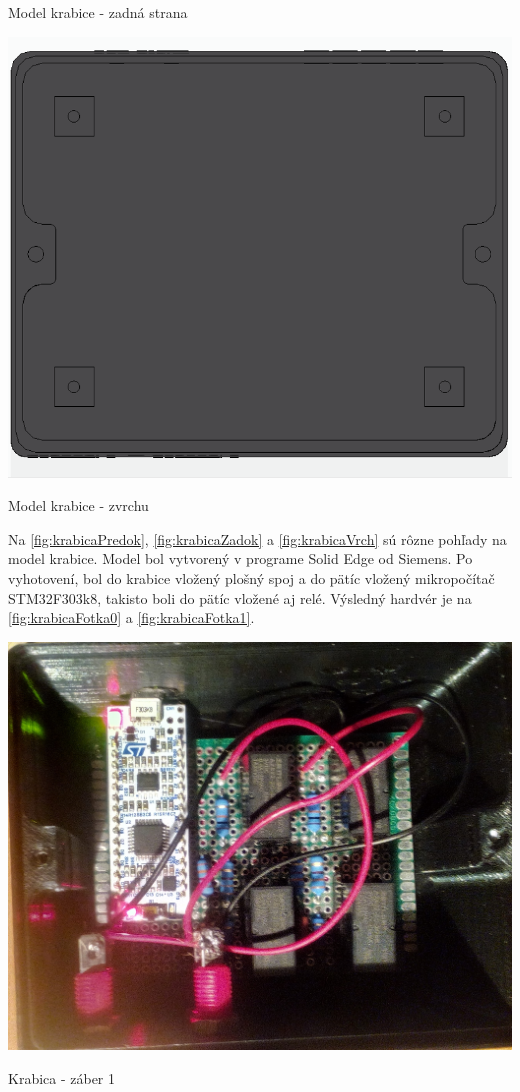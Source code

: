 \documentclass[main.tex]{subfiles}
\begin{document}
\begin{multicols*}{2}
\begin{figurehere}
				\caption{Model krabice - zadná strana}
				\label{fig:krabicaZadok}
			\end{figurehere}
			\begin{figurehere}
				\centering
				\includegraphics[width=\linewidth]{../Obrazky/Box03}
				\caption{Model krabice - zvrchu}
				\label{fig:krabicaVrch}
			\end{figurehere}
		
			\noindent Na \cref{fig:krabicaPredok}, \cref{fig:krabicaZadok} a \cref{fig:krabicaVrch} sú rôzne pohľady na model krabice. Model bol vytvorený v programe Solid Edge od Siemens. Po vyhotovení, bol do krabice vložený plošný spoj a do pätíc vložený mikropočítač STM32F303k8, takisto boli do pätíc vložené aj relé. Výsledný hardvér je na \cref{fig:krabicaFotka0} a  \cref{fig:krabicaFotka1}.
			
			\begin{figurehere}
				\centering
				\includegraphics[width=\linewidth]{../Obrazky/krabicaFotka1-crop}
				\caption{Krabica - záber 1}
				\label{fig:krabicaFotka0}
			\end{figurehere}
		

\end{multicols*}
\end{document}
